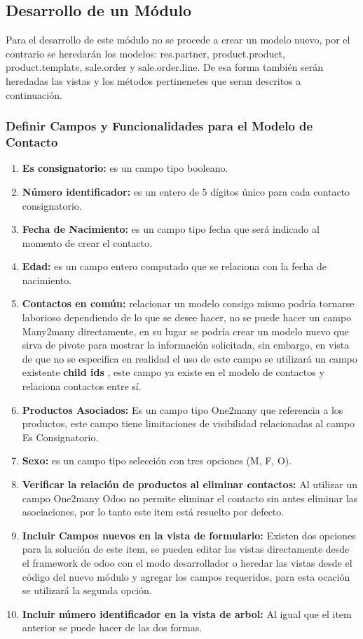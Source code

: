 \documentclass[11pt,letterpaper]{article}
\begin{document}
\subsection{Desarrollo de un Módulo}
Para el desarrollo de este módulo no se procede a crear un modelo nuevo, por el contrario se heredarán los modelos: res.partner, product.product, product.template, sale.order y sale.order.line. De esa forma también serán heredadas las vistas y los métodos pertinenetes que seran descritos a continuación.
\subsubsection{Definir Campos y Funcionalidades para el Modelo de Contacto}
\begin{enumerate}
	\item \textbf{Es consignatorio:} es un campo tipo booleano.
	\item \textbf{Número identificador:} es un entero de 5 dígitos único para cada contacto consignatorio.
	\item \textbf{Fecha de Nacimiento:} es un campo tipo fecha que será indicado al momento de crear el contacto.
	\item \textbf{Edad:} es un campo entero computado que se relaciona con la fecha de nacimiento.
	\item \textbf{Contactos en común:} relacionar un modelo consigo mismo podría tornarse laborioso dependiendo de lo que se desee hacer, no se puede hacer un campo Many2many directamente, en su lugar se podría crear un modelo nuevo que sirva de pivote para mostrar la información solicitada, sin embargo, en vista de que no se especifica en realidad el uso de este campo se utilizará un campo existente \textbf{child ids} , este campo ya existe en el modelo de contactos y relaciona contactos entre sí.
	\item \textbf{Productos Asociados:} Es un campo tipo One2many que referencia a los productos, este campo tiene limitaciones de visibilidad relacionadas al campo Es Consignatorio.
	\item \textbf{Sexo:} es un campo tipo selección con tres opciones (M, F, O).
	\item \textbf{Verificar la relación de productos al eliminar contactos:} Al utilizar un campo One2many Odoo no permite eliminar el contacto sin antes eliminar las asociaciones, por lo tanto este item está resuelto por defecto.
	\item \textbf{Incluir Campos nuevos en la vista de formulario:} Existen dos opciones para la solución de este item, se pueden editar las vistas directamente desde el framework de odoo con el modo desarrollador o heredar las vistas desde el código del nuevo módulo y agregar los campos requeridos, para esta ocación se utilizará la segunda opción.
	\item \textbf{Incluir número identificador en la vista de arbol:} Al igual que el item anterior se puede hacer de las dos formas.	
\end{enumerate}
\end{document}
